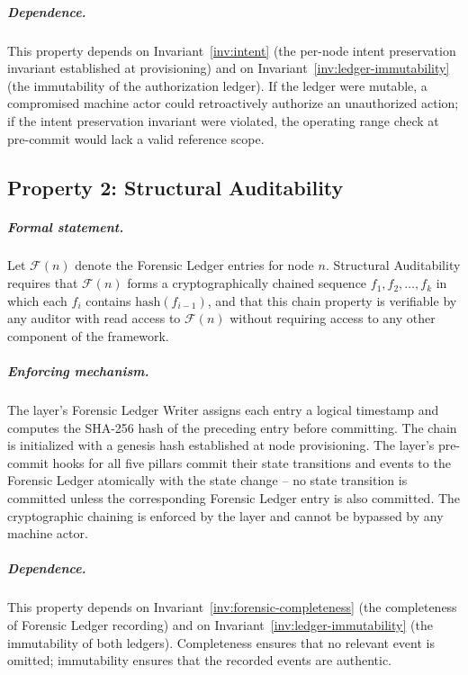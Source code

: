 \subparagraph{Dependence.}  This property depends on Invariant~\ref{inv:intent}
(the per-node intent preservation invariant established at provisioning) and on
Invariant~\ref{inv:ledger-immutability} (the immutability of the authorization
ledger).  If the ledger were mutable, a compromised machine actor could retroactively
authorize an unauthorized action; if the intent preservation invariant were
violated, the operating range check at pre-commit would lack a valid reference
scope.

\subsection{Property 2: Structural Auditability}\label{sec:structural-auditability}


\subparagraph{Formal statement.}  Let $\mathcal{F}(n)$ denote the Forensic Ledger
entries for node $n$.  Structural Auditability requires that $\mathcal{F}(n)$ forms
a cryptographically chained sequence $f_1, f_2, \ldots, f_k$ in which each
$f_i$ contains $\text{hash}(f_{i-1})$, and that this chain property is
verifiable by any auditor with read access to $\mathcal{F}(n)$ without requiring
access to any other component of the framework.

\subparagraph{Enforcing mechanism.}  The \fact{} layer's Forensic Ledger Writer
assigns each entry a logical timestamp and computes the SHA-256 hash of the
preceding entry before committing.  The chain is initialized with a genesis hash
established at node provisioning.  The \fact{} layer's pre-commit hooks for all
five pillars commit their state transitions and events to the Forensic Ledger
atomically with the state change -- no state transition is committed unless the
corresponding Forensic Ledger entry is also committed.  The cryptographic chaining
is enforced by the \fact{} layer and cannot be bypassed by any machine actor.

\subparagraph{Dependence.}  This property depends on Invariant~\ref{inv:forensic-completeness}
(the completeness of Forensic Ledger recording) and on Invariant~\ref{inv:ledger-immutability}
(the immutability of both ledgers).  Completeness ensures that no relevant event
is omitted; immutability ensures that the recorded events are authentic.

